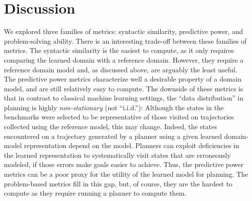 \documentclass[letterpaper]{article} %
\newcommand{\nolam}{NOLAM\xspace}
\newcommand{\offlam}{OffLAM\xspace}
\newcommand{\samshort}{SAM\xspace}
\newif\ifaddcomments
\newcommand{\roni}[1]{\ifaddcomments{\textcolor{red}{[Roni: #1]}}\fi}
\begin{document}

\roni{TODO: Note: like Offlam, ROSAME does not support constants and negative preconditions, 
and it requires injective binding and having a precondition a delete effect}

\section{Discussion}
We explored three families of metrics: syntactic similarity, predictive power, and problem-solving ability. 
There is an interesting trade-off between these families of metrics. 
The syntactic similarity is the easiest to compute, as it only requires comparing the learned domain with a reference domain. However, they require a reference domain model and, as discussed above, are arguably the least useful. 
The predictive power metrics characterize well a desirable property of a domain model, and are still relatively easy to compute. 
The downside of these metrics is that in contrast to classical machine learning settings, the ``data distribution'' in planning is highly \emph{non-stationary} (not ``i.i.d.''):  Although the states in the benchmarks were selected to be representative of those visited on trajectories collected using the reference model, this may change. Indeed, the states encountered on a trajectory generated by a planner using a given learned domain-model representation depend on the model. Planners can exploit deficiencies in the learned representation to systematically visit states that are erroneously modeled, if those errors make goals easier to achieve. Thus, the predictive power metrics can be a poor proxy for the utility of the learned model for planning. The problem-based metrics fill in this gap, but, of course, they are the hardest to compute as they require running a planner to compute them. 
\end{document}
